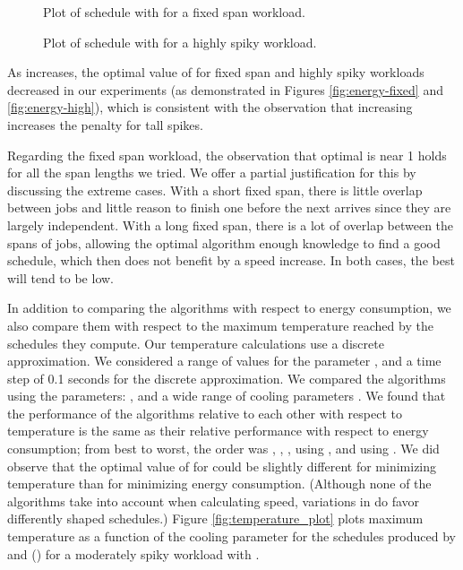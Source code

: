 \documentclass[11pt]{article}
\begin{document}
\begin{figure}
\centering
{}
\caption{Plot of  schedule with  for a fixed span
  workload.}
\label{fig:qOA_Fixed}
\end{figure}

\begin{figure}
\centering
{}
\caption{Plot of  schedule with  for a highly spiky
  workload.}
\label{fig:qOA_High}
\end{figure}

As  increases, the optimal value of  
for fixed span and highly spiky workloads decreased in our
experiments (as demonstrated in Figures 
\ref{fig:energy-fixed} and \ref{fig:energy-high}), which is consistent
with the observation that increasing  increases the penalty
for tall spikes.

Regarding the fixed span workload, the observation that optimal
 is near 1 holds for all the span lengths we tried.
We offer a partial justification for this by discussing the extreme cases.
With a short fixed span, there is little overlap between jobs and
little reason to finish one before the next arrives since they are
largely independent.
With a long fixed span, there is a lot of overlap between the
spans of jobs, allowing the optimal algorithm enough knowledge
to find a good schedule, which then does not benefit by a speed increase.
In both cases, the best  will tend to be low.

In addition to comparing the algorithms with respect to energy
consumption, we also compare them with respect to the maximum
temperature reached by the schedules they compute.
Our temperature calculations use a discrete approximation.
We considered a range of values for the parameter , and a time step of 0.1
seconds for the discrete approximation.
We compared the algorithms using the parameters: ,
and a wide range of cooling parameters .
We found that the
performance of the algorithms relative to each other with respect to
temperature is the same as their relative performance with respect to
energy consumption; from best to worst, the order was , ,
,  using , and  using .
We did observe that the optimal value of  for  could be
slightly different for minimizing temperature than for minimizing
energy consumption.
(Although none of the algorithms take  into account when
calculating speed, variations in  do favor differently shaped
schedules.)
Figure \ref{fig:temperature_plot} plots maximum
temperature as a function of the cooling parameter for the schedules
produced by   and  () for a moderately
spiky workload with .
\end{document}
